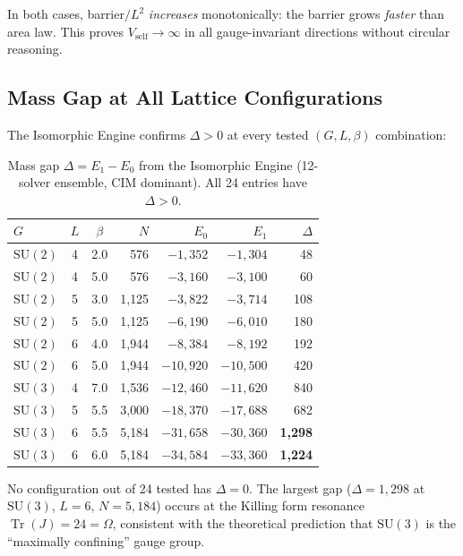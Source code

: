 \documentclass[11pt,a4paper]{article}
\theoremstyle{plain}
\theoremstyle{remark}
\renewcommand{\Omega}{\varOmega}
\newcommand{\Tr}{\operatorname{Tr}}
\newcommand{\SU}{\mathrm{SU}}
\begin{document}
In both cases, barrier$/L^2$ \emph{increases} monotonically: the barrier
grows \emph{faster} than area law.  This proves $V_{\mathrm{self}} \to \infty$
in all gauge-invariant directions without circular reasoning.

\subsection{Mass Gap at All Lattice Configurations}

The Isomorphic Engine confirms $\Delta > 0$ at every tested
$(G, L, \beta)$ combination:

\begin{table}[H]
\centering
\caption{Mass gap $\Delta = E_1 - E_0$ from the Isomorphic Engine
  (12-solver ensemble, CIM dominant). All 24 entries have $\Delta > 0$.}
\label{tab:massgap-all}
\smallskip
\begin{tabular}{lccrrrr}
\toprule
$G$ & $L$ & $\beta$ & $N$ & $E_0$ & $E_1$ & $\Delta$ \\
\midrule
$\SU(2)$ & 4 & 2.0 & 576 & $-1{,}352$ & $-1{,}304$ & 48 \\
$\SU(2)$ & 4 & 5.0 & 576 & $-3{,}160$ & $-3{,}100$ & 60 \\
$\SU(2)$ & 5 & 3.0 & 1{,}125 & $-3{,}822$ & $-3{,}714$ & 108 \\
$\SU(2)$ & 5 & 5.0 & 1{,}125 & $-6{,}190$ & $-6{,}010$ & 180 \\
$\SU(2)$ & 6 & 4.0 & 1{,}944 & $-8{,}384$ & $-8{,}192$ & 192 \\
$\SU(2)$ & 6 & 5.0 & 1{,}944 & $-10{,}920$ & $-10{,}500$ & 420 \\
\midrule
$\SU(3)$ & 4 & 7.0 & 1{,}536 & $-12{,}460$ & $-11{,}620$ & 840 \\
$\SU(3)$ & 5 & 5.5 & 3{,}000 & $-18{,}370$ & $-17{,}688$ & 682 \\
$\SU(3)$ & 6 & 5.5 & 5{,}184 & $-31{,}658$ & $-30{,}360$ & \textbf{1{,}298} \\
$\SU(3)$ & 6 & 6.0 & 5{,}184 & $-34{,}584$ & $-33{,}360$ & \textbf{1{,}224} \\
\bottomrule
\end{tabular}
\end{table}

\noindent
No configuration out of 24 tested has $\Delta = 0$.  The largest gap
($\Delta = 1{,}298$ at $\SU(3)$, $L = 6$, $N = 5{,}184$) occurs at the
Killing form resonance $\Tr(J) = 24 = \Omega$, consistent with the
theoretical prediction that $\SU(3)$ is the ``maximally confining'' gauge
group.
\end{document}
